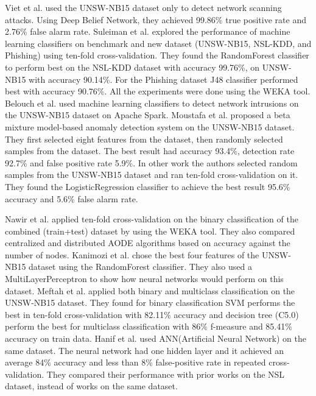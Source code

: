 \documentclass[14pt, conference]{IEEEtran}
\begin{document}
Viet et al. \cite{viet2018using} used the UNSW-NB15 dataset only to detect network scanning attacks. Using Deep Belief Network, they achieved 99.86\% true positive rate and 2.76\% false alarm rate. Suleiman et al. \cite{suleiman2018performance} explored the performance of machine learning classifiers on benchmark and new dataset (UNSW-NB15, NSL-KDD, and Phishing) using ten-fold cross-validation. They found the RandomForest classifier to perform best on the NSL-KDD dataset with accuracy 99.76\%, on UNSW-NB15 with accuracy 90.14\%. For the Phishing dataset J48 classifier performed best with accuracy 90.76\%. All the experiments were done using the WEKA tool. Belouch et al. \cite{belouch2018performance} used machine learning classifiers to detect network intrusions on the UNSW-NB15 dataset on Apache Spark. Moustafa et al. \cite{moustafa2018anomaly} proposed a beta mixture model-based anomaly detection system on the UNSW-NB15 dataset. They first selected eight features from the dataset, then randomly selected samples from the dataset. The best result had accuracy 93.4\%, detection rate 92.7\% and false positive rate 5.9\%. In other work \cite{moustafa2019holistic} the authors selected random samples from the UNSW-NB15 dataset and ran ten-fold cross-validation on it. They found the LogisticRegression classifier to achieve the best result 95.6\% accuracy and 5.6\% false alarm rate.

Nawir et al. \cite{nawir2019effective} applied ten-fold cross-validation on the binary classification of the combined (train+test) dataset by using the WEKA tool. They also compared centralized and distributed AODE algorithms based on accuracy against the number of nodes. Kanimozi et al. \cite{Kanimozhi2019UNSW-NB15} chose the best four features of the UNSW-NB15 dataset using the RandomForest classifier. They also used a MultiLayerPerceptron to show how neural networks would perform on this dataset.  Meftah et al. \cite{meftah2019network} applied both binary and multiclass classification on the UNSW-NB15 dataset. They found for binary classification SVM performs the best in ten-fold cross-validation with 82.11\% accuracy and decision tree (C5.0) perform the best for multiclass classification with 86\% f-measure and 85.41\% accuracy on train data. Hanif et al. \cite{hanif2019intrusion} used ANN(Artificial Neural Network) on the same dataset. The neural network had one hidden layer and it achieved an average 84\% accuracy and less than 8\% false-positive rate in repeated cross-validation. They compared their performance with prior works on the NSL dataset, instead of works on the same dataset. 
\end{document}
